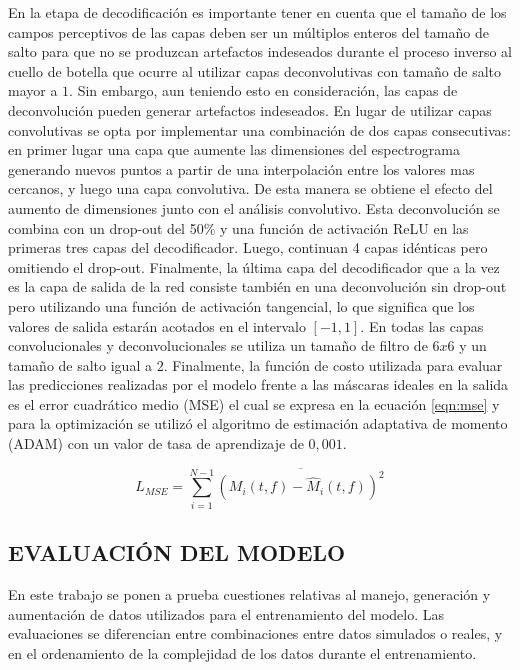 En la etapa de decodificación es importante tener en cuenta que el tamaño de los campos perceptivos de las capas deben ser un múltiplos enteros del tamaño de salto para que no se produzcan artefactos indeseados durante el proceso inverso al cuello de botella que ocurre al utilizar capas deconvolutivas con tamaño de salto mayor a $1$. Sin embargo, aun teniendo esto en consideración, las capas de deconvolución pueden generar artefactos indeseados. En lugar de utilizar capas convolutivas se opta por implementar una combinación de dos capas consecutivas: en primer lugar una capa que aumente las dimensiones del espectrograma generando nuevos puntos a partir de una interpolación entre los valores mas cercanos, y luego una capa convolutiva. De esta manera se obtiene el efecto del aumento de dimensiones junto con el análisis convolutivo. Esta deconvolución se combina con un drop-out del 50\% y una función de activación ReLU en las primeras tres capas del decodificador. Luego, continuan 4 capas idénticas pero omitiendo el drop-out. Finalmente, la última capa del decodificador que a la vez es la capa de salida de la red consiste también en una deconvolución sin drop-out pero utilizando una función de activación tangencial, lo que significa que los valores de salida estarán acotados en el intervalo $[-1, 1]$.
En todas las capas convolucionales y deconvolucionales se utiliza un tamaño de filtro de $6x6$ y un tamaño de salto igual a $2$. 
Finalmente, la función de costo utilizada para evaluar las predicciones realizadas por el modelo frente a las máscaras ideales en la salida es el error cuadrático medio (MSE) el cual se expresa en la ecuación \ref{eqn:mse} y para la optimización se utilizó el algoritmo de estimación adaptativa de momento (ADAM) \cite{adam} con un valor de tasa de aprendizaje de $0,001$. 

\begin{equation}
\label{eqn:mse}
	L_{MSE} = \sum_{i=1}^{N-1}\overline{(M_{i}(t,f) - \hat{M}_{i}(t,f))^{2}} 
\end{equation}

\subsection[Evaluación del modelo]{EVALUACIÓN DEL MODELO}
En este trabajo se ponen a prueba cuestiones relativas al manejo, generación y aumentación de datos utilizados para el entrenamiento del modelo. Las evaluaciones se diferencian entre combinaciones entre datos simulados o reales, y en el ordenamiento de la complejidad de los datos durante el entrenamiento. 

